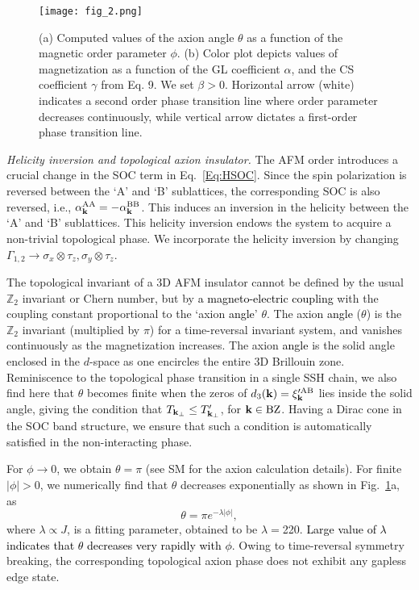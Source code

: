 \documentclass[aps,prl,showpacs,twocolumn,groupedaddress]{revtex4-1}
\newcommand{\blue}{\textcolor{black}}
\begin{document}
\begin{figure}
\texttt{[image: fig\_2.png]}
\caption{(a) Computed values of the axion angle $\theta$ as a function of the magnetic order parameter $\phi$. (b) Color plot depicts values of magnetization as a function of the GL coefficient $\alpha$, and the CS coefficient $\gamma$ from Eq. 9. We set $\beta>0$. Horizontal arrow (white) indicates a second order phase transition line where order parameter decreases continuously, while vertical arrow dictates a first-order phase transition line.}
\label{axion_angle}
\end{figure}

{\it Helicity inversion and topological axion insulator.} The AFM order introduces a crucial change in the SOC term in Eq.~\eqref{Eq:HSOC}. Since the spin polarization is reversed between the `A' and `B' sublattices, the corresponding SOC is also reversed, i.e., $\alpha^{\rm AA}_{\bf k}=-\alpha^{\rm BB}_{\bf k}$. This induces an inversion in the helicity between the `A' and `B' sublattices. This helicity inversion endows the system to acquire a non-trivial topological phase.\cite{TDNC,SODW,TDRMP} We incorporate the helicity inversion by changing $\Gamma_{1,2}\rightarrow\sigma_x\otimes\tau_z,\sigma_y\otimes\tau_z$. 

The topological invariant of a 3D AFM insulator cannot be defined by the usual $\mathbb{Z}_2$ invariant or Chern number, but by \blue{a magneto-electric coupling} with the coupling constant proportional to the `axion \blue{angle}' $\theta$\cite{zhang_prb,JMoore,axionJPSJ}. The axion \blue{angle} ($\theta$) is the $\mathbb{Z}_2$ invariant (multiplied by $\pi$) for a time-reversal invariant system, and vanishes continuously as the magnetization increases\cite{JMoore,zhang_nat}. The axion \blue{angle} is the solid angle enclosed in the $d$-space as one encircles the entire 3D Brillouin zone.\cite{zhang_nat,axionJPSJ} Reminiscence to the topological phase transition in a single SSH chain, we also find here that $\theta$ becomes finite when the zeros of $d_3({\bf k})={\xi^{\prime{\rm AB}}_{\bf k}}$ lies inside the solid angle, giving the condition that $T_{{\bf k}_{\perp}}\le T'_{{\bf k}_{\perp}}$, for ${\bf k}\in {\rm BZ}$. Having a Dirac cone in the SOC band structure, we ensure that such a condition is automatically satisfied in the non-interacting phase. 

For $\phi\rightarrow 0$, we obtain $\theta=\pi$ (see SM\cite{SM} for the axion calculation details). For finite $|\phi|>0$, we numerically find that $\theta$ decreases exponentially as shown in Fig.~\ref{axion_angle}a, as
\begin{equation}
\theta=\pi e^{-\lambda |\phi|}, 
\label{axion}
\end{equation}
where $\lambda\propto J$, is a fitting parameter, obtained to be $\lambda=$220. \blue{Large value of $\lambda$ indicates that $\theta$ decreases very rapidly with $\phi$}. 
Owing to time-reversal symmetry breaking, the corresponding topological axion phase does not exhibit any gapless edge state.\cite{foot_surface}
\end{document}
